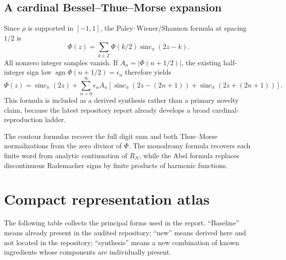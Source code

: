 \documentclass[11pt,oneside]{article}
\theoremstyle{definition}
\newcommand{\sincpi}{\operatorname{sinc}_{\!\pi}}
\newcommand{\Z}{\mathbb Z}
\newcommand{\sgn}{\operatorname{sgn}}
\begin{document}
\subsection{A cardinal Bessel--Thue--Morse expansion}

Since \(\rho\) is supported in \([-1,1]\), the Paley--Wiener/Shannon formula at spacing
\(1/2\) is
\begin{equation}
 \Phi(z)=\sum_{k\in\Z}\Phi(k/2)\sincpi(2z-k).
 \label{eq:Shannon-Phi}
\end{equation}
All nonzero integer samples vanish. If
\(A_n=|\Phi(n+1/2)|\), the existing half-integer sign law
\(\sgn\Phi(n+1/2)=\epsilon_n\) therefore yields
\begin{equation}
 \Phi(z)=\sincpi(2z)+\sum_{n=0}^{\infty}\epsilon_nA_n
 \left[\sincpi(2z-(2n+1))+\sincpi(2z+(2n+1))\right].
 \label{eq:Shannon-TM}
\end{equation}
This formula is included as a derived synthesis rather than a primary novelty claim, because
the latest repository report already develops a broad cardinal-reproduction ladder.

\begin{novelbox}
The contour formulas recover the full digit sum and both Thue--Morse normalizations from the
zero divisor of \(\Phi\). The monodromy formula recovers each finite word from analytic
continuation of \(R_N\), while the Abel formula replaces discontinuous Rademacher signs by
finite products of harmonic functions.
\end{novelbox}

\section{Compact representation atlas}
\label{sec:atlas}

The following table collects the principal forms used in the report. ``Baseline'' means
already present in the audited repository; ``new'' means derived here and not located in the
repository; ``synthesis'' means a new combination of known ingredients whose components are
individually present.
\end{document}
